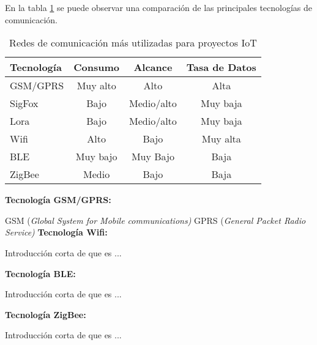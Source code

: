 En la tabla \ref{tab:Tecno} se puede observar una comparación de las principales tecnologías de comunicación.

\begin{table}[h]
	\centering
	\caption[Redes de comunicación]{Redes de comunicación más utilizadas para proyectos IoT}
	\begin{tabular}{l c c c}    
		\toprule
		\textbf{Tecnología} 	 & \textbf{Consumo}  & \textbf{Alcance} 	& \textbf{Tasa de Datos} \\
		\midrule
		GSM/GPRS				 & Muy alto			& Alto					&	Alta \\		
		SigFox					 & Bajo				& Medio/alto			&	Muy baja \\
		Lora					 & Bajo				& Medio/alto			&	Muy baja\\	
		Wifi					 & Alto				& Bajo					&	Muy alta \\
		BLE					 	 & Muy bajo			& Muy Bajo				&	Baja \\
		ZigBee					 & Medio			& Bajo					&	Baja \\	
		\bottomrule
		\hline
	\end{tabular}
	\label{tab:Tecno}
\end{table}

\textbf{Tecnología GSM/GPRS:}

GSM (\textit{Global System for Mobile communications)}
GPRS (\textit{General Packet Radio Service)}
\textbf{Tecnología Wifi:}

Introducción corta de que es ...

\textbf{Tecnología BLE:}

Introducción corta de que es ...

\textbf{Tecnología ZigBee:}

Introducción corta de que es ...


